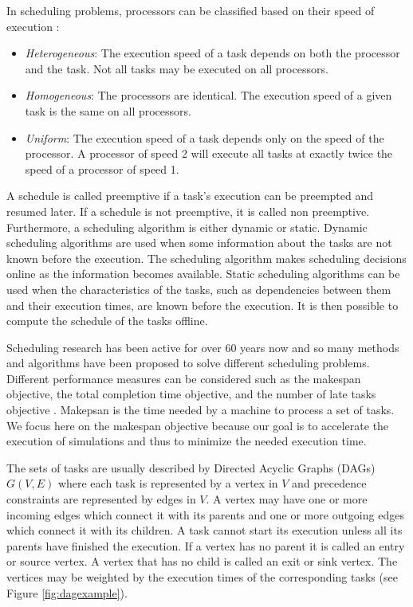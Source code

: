 In scheduling problems, processors can be classified based on their speed of execution \cite{davis:2011}:

\begin{itemize}
\item \textit{Heterogeneous}: The execution speed of a task depends on both the processor and the task. Not all tasks may be executed on all processors.
\item \textit{Homogeneous}: The processors are identical. The execution speed of a given task is the same on all processors.
\item \textit{Uniform}: The execution speed of a task depends only on the speed of the processor. A processor of speed 2 will execute all tasks at exactly twice the speed of a processor of speed 1.
\end{itemize}

A schedule is called preemptive if a task's execution can be preempted and resumed later. If a schedule is not preemptive, it is called non preemptive. Furthermore, a scheduling algorithm is either dynamic or static. Dynamic scheduling algorithms are used when some information about the tasks are not known before the execution. The scheduling algorithm makes scheduling decisions online as the information becomes available. Static scheduling algorithms can be used when the characteristics of the tasks, such as dependencies between them and their execution times, are known before the execution. It is then possible to compute the schedule of the tasks offline.

Scheduling research has been active for over 60 years now and so many methods and algorithms have been proposed to solve different scheduling problems. Different performance measures can be considered such as the makespan objective, the total completion time objective, and the number of late tasks objective \cite{leung:2004}. Makepsan is the time needed by a machine to process a set of tasks. We focus here on the makespan objective because our goal is to accelerate the execution of simulations and thus to minimize the needed execution time.

The sets of tasks are usually described by Directed Acyclic Graphs (DAGs) $G(V,E)$ where each task is represented by a vertex in $V$ and precedence constraints are represented by edges in $V$. A vertex may have one or more incoming edges which connect it with its parents and one or more outgoing edges which connect it with its children. A task cannot start its execution unless all its parents have finished the execution. If a vertex has no parent it is called an entry or source vertex. A vertex that has no child is called an exit or sink vertex. The vertices may be weighted by the execution times of the corresponding tasks (see Figure \ref{fig:dagexample}).

